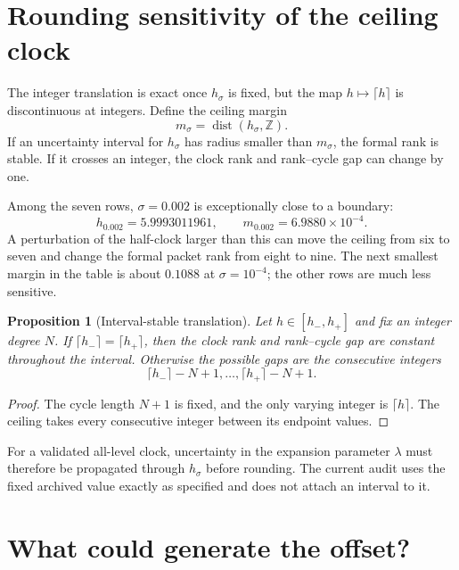 \documentclass[12pt]{article}
\newtheorem{proposition}[theorem]{Proposition}
\theoremstyle{remark}
\begin{document}
\section{Rounding sensitivity of the ceiling clock}

The integer translation is exact once $h_\sigma$ is fixed, but the map
$h\mapsto\lceil h\rceil$ is discontinuous at integers.  Define the ceiling
margin
\[
 m_\sigma=\operatorname{dist}(h_\sigma,\mathbb Z).
\]
If an uncertainty interval for $h_\sigma$ has radius smaller than
$m_\sigma$, the formal rank is stable.  If it crosses an integer, the clock
rank and rank--cycle gap can change by one.

Among the seven rows, $\sigma=0.002$ is exceptionally close to a boundary:
\[
 h_{0.002}=5.9993011961,
 \qquad
 m_{0.002}=6.9880\times10^{-4}.
\]
A perturbation of the half-clock larger than this can move the ceiling from
six to seven and change the formal packet rank from eight to nine.  The next
smallest margin in the table is about $0.1088$ at $\sigma=10^{-4}$; the other
rows are much less sensitive.

\begin{proposition}[Interval-stable translation]
Let $h\in[h_-,h_+]$ and fix an integer degree $N$.  If
$\lceil h_-\rceil=\lceil h_+\rceil$, then the clock rank and rank--cycle gap
are constant throughout the interval.  Otherwise the possible gaps are the
consecutive integers
\[
 \lceil h_-\rceil-N+1,
 \ldots,
 \lceil h_+\rceil-N+1.
\]
\end{proposition}

\begin{proof}
The cycle length $N+1$ is fixed, and the only varying integer is
$\lceil h\rceil$.  The ceiling takes every consecutive integer between its
endpoint values.
\end{proof}

For a validated all-level clock, uncertainty in the expansion parameter
$\lambda$ must therefore be propagated through $h_\sigma$ before rounding.
The current audit uses the fixed archived value exactly as specified and does
not attach an interval to it.

\section{What could generate the offset?}
\end{document}

